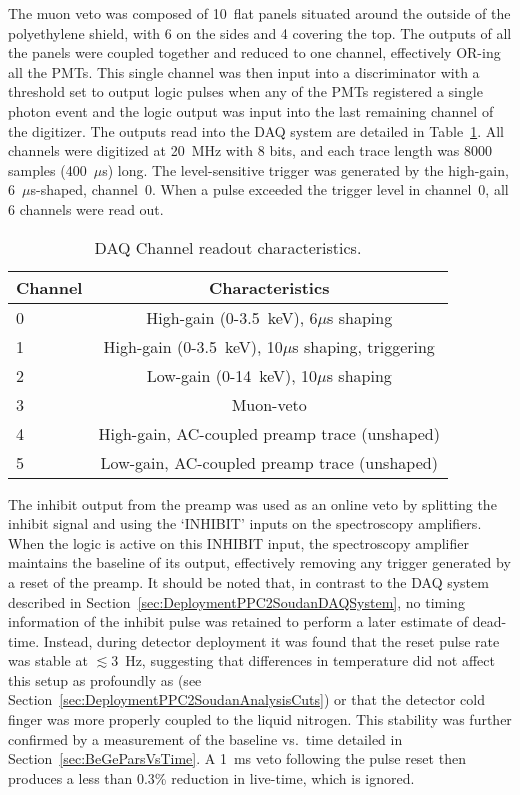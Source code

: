 The muon veto was composed of 10~flat panels situated around the outside of the polyethylene shield, with 6 on the sides and 4 covering the top.  The outputs of all the panels were coupled together and reduced to one channel, effectively OR-ing all the PMTs.  This single channel was then input into a discriminator with a threshold set to output logic pulses when any of the PMTs registered a single photon event and the logic output was input into the last remaining channel of the digitizer.  The outputs read into the DAQ system are detailed in Table~\ref{tab:SoudanDAQTable}.  All channels were digitized at 20~MHz with 8 bits, and each trace length was 8000 samples (400~$\mu$s) long.  The level-sensitive trigger was generated by the high-gain, 6~$\mu$s-shaped, channel~0.  When a pulse exceeded the trigger level in channel~0, all 6 channels were read out.  

	\begin{table}
		\centering
		\begin{tabular}{l c}
			\toprule
			Channel & Characteristics \\
			\midrule
			0 & High-gain (0-3.5~keV), 6$\mu$s shaping \\
			1 & High-gain (0-3.5~keV), 10$\mu$s shaping, triggering \\
			2 & Low-gain (0-14~keV), 10$\mu$s shaping \\
			3 & Muon-veto \\
			4 & High-gain, AC-coupled preamp trace (unshaped) \\
			5 & Low-gain, AC-coupled preamp trace (unshaped) \\
			\bottomrule
		\end{tabular}
		\caption[DAQ Channel readout characteristics]
		{DAQ Channel readout characteristics. }
		\label{tab:SoudanDAQTable}
	\end{table}

The inhibit output from the preamp was used as an online veto by splitting the inhibit signal and using the `INHIBIT' inputs on the spectroscopy amplifiers.  When the logic is active on this INHIBIT input, the spectroscopy amplifier maintains the baseline of its output, effectively removing any trigger generated by a reset of the preamp.  It should be noted that, in contrast to the DAQ system described in Section~\ref{sec:DeploymentPPC2SoudanDAQSystem}, no timing information of the inhibit pulse was retained to perform a later estimate of dead-time.  Instead, during detector deployment it was found that the reset pulse rate was stable at $\lesssim$3~Hz, suggesting that differences in temperature did not affect this setup as profoundly as  (see Section~\ref{sec:DeploymentPPC2SoudanAnalysisCuts}) or that the detector cold finger was more properly coupled to the liquid nitrogen.  This stability was further confirmed by a measurement of the baseline vs.~time detailed in Section~\ref{sec:BeGeParsVsTime}.
A 1~ms veto following the pulse reset then produces a less than 0.3\% reduction in live-time, which is ignored.  %

